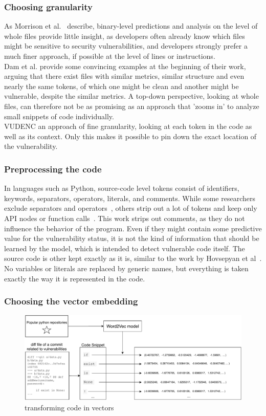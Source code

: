 \documentclass[
a4paper,
pagesize,
pdftex,
12pt,
twoside, %
BCOR=5mm, %
ngerman,
fleqn,
final,
]{scrartcl}
\begin{document}
	\subsubsection{Choosing granularity}
	As Morrison  et al.~\cite{Morrison.2015} describe, binary-level predictions and analysis on the level of whole files provide little insight, as developers often already know which files might be sensitive to security vulnerabilities, and developers strongly prefer a much finer approach, if possible at the level of lines or instructions.\\
	Dam et al.\cite{Dam.2017} provide some convincing examples at the beginning of their work, arguing that there exist files with similar metrics, similar structure and even nearly the same tokens, of which one might be clean and another might be vulnerable, despite the similar metrics. A top-down perspective, looking at whole files, can therefore not be as promising as an approach that 'zooms in' to analyze small snippets of code individually.\\
	VUDENC an approach of fine granularity, looking at each token in the code as well as its context. Only this makes it possible to pin down the exact location of the vulnerability. 
	
	\subsubsection{Preprocessing the code}
	In languages such as Python, source-code level tokens consist of identifiers, keywords, separators, operators, literals, and comments. While some researchers exclude separators and operators~\cite{Pang.2015}, others strip out a lot of tokens and keep only API nodes or function calls~\cite{Yamaguchi.2012}. This work strips out comments, as they do not influence the behavior of the program. Even if they might contain some predictive value for the vulnerability status, it is not the kind of information that should be learned by the model, which is intended to detect vulnerable code itself. The source code is other kept exactly as it is, similar to the work by Hovsepyan et al~\cite{Hovsepyan.2012}. No variables or literals are replaced by generic names, but everything is taken  exactly the way it is represented in the code. 
	
	\subsubsection{Choosing the vector embedding}
	\begin{figure}[ht]
		\centering
		\includegraphics[width=\linewidth]{img/Word2Vec}
		\caption{transforming code in vectors}
		\label{fig:word2vec}
	\end{figure}
	
\end{document}
